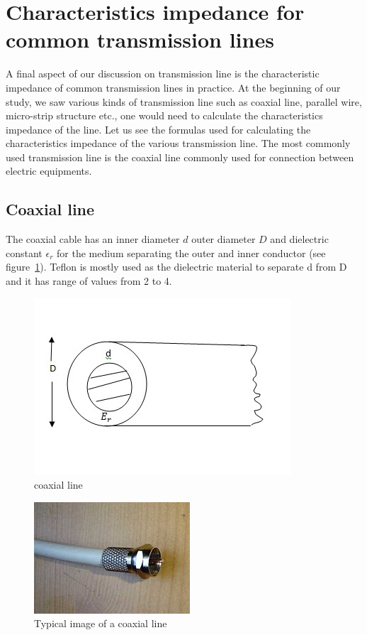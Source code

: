 \section{Characteristics impedance for common transmission lines}
A final aspect of our discussion on transmission line is the characteristic impedance of common transmission lines in practice. At the beginning of our study, we saw various kinds of transmission line such as coaxial line, parallel wire, micro-strip structure etc., one would need to calculate the characteristics impedance of the line. Let us see the formulas used for calculating the characteristics impedance of the various transmission line. The most commonly used transmission line is the coaxial line commonly used for connection between electric equipments.

\subsection{Coaxial line}
The coaxial cable has an inner diameter $d$ outer diameter $D$ and dielectric constant $\epsilon_r$ for the medium separating the outer and inner conductor (see figure~\ref{fig:coaxialcable1}). Teflon is mostly used as the dielectric material to separate d from D and it has range of values from 2 to 4.
\begin{figure}[h]
\centering
\includegraphics[width=1\linewidth]{./graphics/coaxialcable1}
\caption{coaxial line}
\label{fig:coaxialcable1}
\end{figure}
\begin{figure}[h]
\centering
\includegraphics[scale=0.8]{./graphics/coaxialcable}
\caption{Typical image of a coaxial line}
\end{figure}

